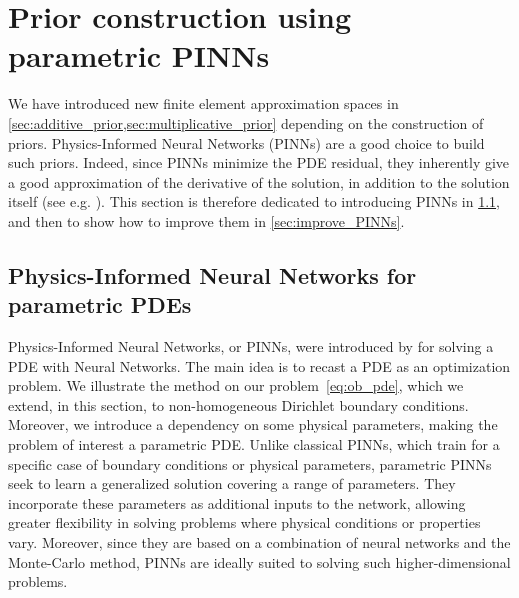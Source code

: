 \section{Prior construction using parametric PINNs}
\label{sec:prior_construction}


We have introduced new finite element approximation spaces in \cref{sec:additive_prior,sec:multiplicative_prior} depending on the construction of priors.
Physics-Informed Neural Networks (PINNs) are a good choice to build such priors.
Indeed, since PINNs minimize the PDE residual, they inherently give a good approximation of the derivative of the solution, in addition to the solution itself (see e.g. \cite{RAISSI2019686}).
This section is therefore dedicated to introducing PINNs in \cref{sec:PINNs_parametric_PDE}, and then to show how to improve them in \cref{sec:improve_PINNs}.

\subsection{Physics-Informed Neural Networks for parametric PDEs}
\label{sec:PINNs_parametric_PDE}

Physics-Informed Neural Networks, or PINNs, were introduced by \cite{RAISSI2019686} %
for solving a PDE with Neural Networks.
The main idea is to recast a PDE as an optimization problem.
We illustrate the method on our problem~\eqref{eq:ob_pde}, which we extend, in this section, to non-homogeneous Dirichlet boundary conditions.
Moreover, we introduce a dependency on some physical parameters, making the problem of interest a parametric PDE.
Unlike classical PINNs, which train for a specific case of boundary conditions or physical parameters, parametric PINNs seek to learn a generalized solution covering a range of parameters.
They incorporate these parameters as additional inputs to the network, allowing greater flexibility in solving problems where physical conditions or properties vary.
Moreover, since they are based on a combination of neural networks and the Monte-Carlo method, PINNs are ideally suited to solving such higher-dimensional problems.

